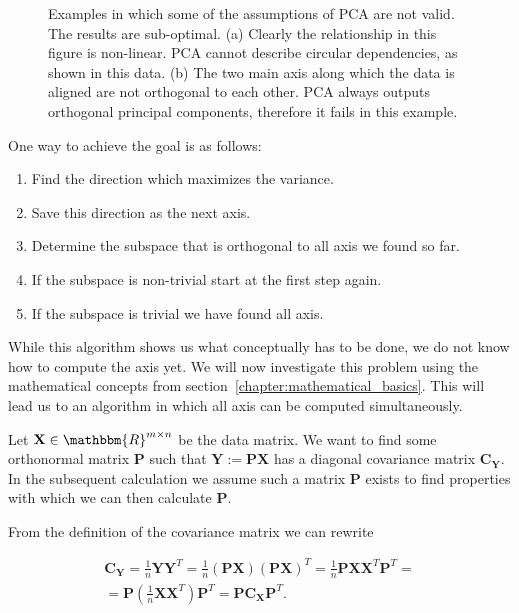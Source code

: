 \begin{figure}
	\caption{Examples in which some of the assumptions of PCA are not valid. The results are sub-optimal. \newline (a) Clearly the relationship in this figure is non-linear. PCA cannot describe circular dependencies, as shown in this data. \newline (b) The two main axis along which the data is aligned are not orthogonal to each other. PCA always outputs orthogonal principal components, therefore it fails in this example.}
	\label{fig:pca_fails}
\end{figure}

One way to achieve the goal is as follows:
\begin{enumerate}
	\item Find the direction which maximizes the variance.
	\item Save this direction as the next axis.
	\item Determine the subspace that is orthogonal to all axis we found so far.
	\item If the subspace is non-trivial start at the first step again.
	\item If the subspace is trivial we have found all axis.
\end{enumerate}

While this algorithm shows us what conceptually has to be done, we do not know how to compute the axis yet. We will now investigate this problem using the mathematical concepts from section~\ref{chapter:mathematical_basics}. This will lead us to an algorithm in which all axis can be computed simultaneously.

Let $\mathbf{X} \in \mathbbm{R}^{m\times n}$ be the data matrix. We want to find some orthonormal matrix $\mathbf{P}$ such that $\mathbf{Y}:=\mathbf{PX}$ has a diagonal covariance matrix $\mathbf{C}_{\mathbf{Y}}$. \color{change} In the subsequent calculation we assume such a matrix $\mathbf{P}$ exists to find properties with which we can then calculate $\mathbf{P}$. \color{black}

\newpage
\color{change}From the definition of the covariance matrix we can rewrite \color{black}

\begin{align*}
	\mathbf{C}_{\mathbf{Y}} = \frac{1}{n}\mathbf{YY}^T = \frac{1}{n}(\mathbf{PX})(\mathbf{PX})^T = \frac{1}{n}\mathbf{PX}\mathbf{X}^T\mathbf{P}^T =\\
	= \mathbf{P}\left(\frac{1}{n}\mathbf{X}\mathbf{X}^T\right)\mathbf{P}^T = \mathbf{P}\mathbf{C}_\mathbf{X}\mathbf{P}^T.
\end{align*}

